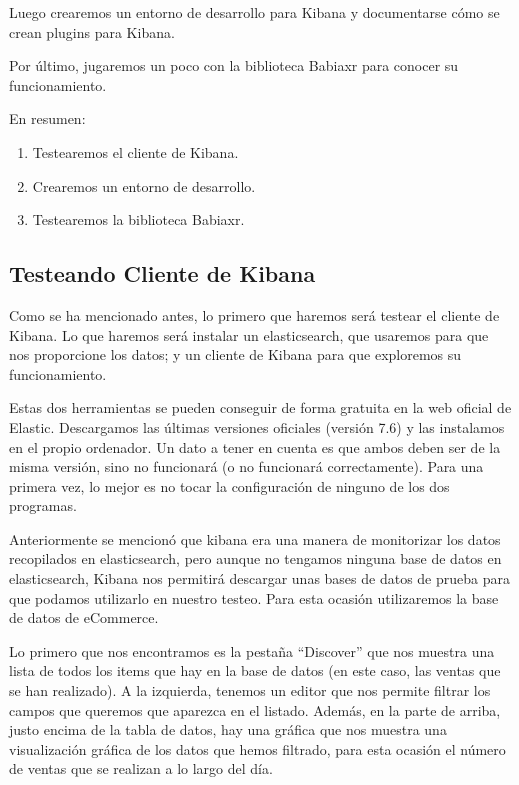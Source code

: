 \documentclass[a4paper, 12pt]{book}
\begin{document}
Luego crearemos un entorno de desarrollo para Kibana y documentarse cómo se crean plugins para Kibana.

Por último, jugaremos un poco con la biblioteca Babiaxr para conocer su funcionamiento.

En resumen:
\begin{enumerate}
    \item Testearemos el cliente de Kibana.
    \item Crearemos un entorno de desarrollo.
    \item Testearemos la biblioteca Babiaxr.
\end{enumerate}


\subsection{Testeando Cliente de Kibana}

Como se ha mencionado antes, lo primero que haremos será testear el cliente de Kibana. Lo que haremos será instalar un elasticsearch, que usaremos para que nos proporcione los datos; y un cliente de Kibana para que exploremos su funcionamiento.

Estas dos herramientas se pueden conseguir de forma gratuita en la web oficial de Elastic. Descargamos las últimas versiones oficiales (versión 7.6) y las instalamos en el propio ordenador. Un dato a tener en cuenta es que ambos deben ser de la misma versión, sino no funcionará (o no funcionará correctamente). Para una primera vez, lo mejor es no tocar la configuración de ninguno de los dos programas.

Anteriormente se mencionó que kibana era una manera de monitorizar los datos recopilados en elasticsearch, pero aunque no tengamos ninguna base de datos en elasticsearch, Kibana nos permitirá descargar unas bases de datos de prueba para que podamos utilizarlo en nuestro testeo. Para esta ocasión utilizaremos la base de datos de eCommerce.

Lo primero que nos encontramos es la pestaña “Discover” que nos muestra una lista de todos los items que hay en la base de datos (en este caso, las ventas que se han realizado). A la izquierda, tenemos un editor que nos permite filtrar los campos que queremos que aparezca en el listado. Además, en la parte de arriba, justo encima de la tabla de datos, hay una gráfica que nos muestra una visualización gráfica de los datos que hemos filtrado, para esta ocasión el número de ventas que se realizan a lo largo del día.
\end{document}
